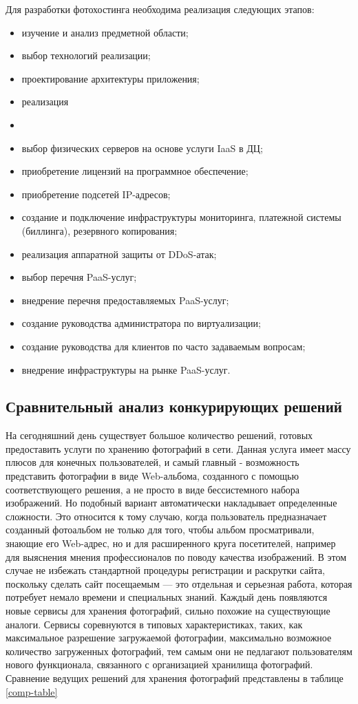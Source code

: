 Для разработки фотохостинга необходима реализация следующих этапов:
\begin{itemize}
    \item изучение и анализ предметной области;
    \item выбор технологий реализации;
    \item проектирование архитектуры приложения;
    \item реализация 
    \item 
    \item выбор физических серверов на основе услуги IaaS в ДЦ;
    \item приобретение лицензий на программное обеспечение;
    \item приобретение подсетей IP-адресов;
    \item создание и подключение инфраструктуры мониторинга, платежной системы (биллинга), резервного копирования;
    \item реализация аппаратной защиты от DDoS-атак;
    \item выбор перечня PaaS-услуг;
    \item внедрение перечня предоставляемых PaaS-услуг;
    \item создание руководства администратора по виртуализации;
    \item создание руководства для клиентов по часто задаваемым вопросам;
    \item внедрение инфраструктуры на рынке PaaS-услуг.
\end{itemize}

\subsection{Сравнительный анализ конкурирующих решений} \label{comparsion}

На сегодняшний день существует большое количество решений, готовых предоставить услуги по хранению фотографий в сети.
Данная услуга имеет массу плюсов для конечных пользователей, и самый главный  - возможность представить фотографии в виде Web-альбома, созданного с помощью соответствующего решения, а не просто в виде бессистемного набора изображений.
Но подобный вариант автоматически накладывает определенные сложности. 
Это относится к тому случаю, когда пользователь предназначает созданный фотоальбом не только для того, чтобы альбом просматривали, знающие его Web-адрес, но и для расширенного круга посетителей, например для выяснения мнения профессионалов по поводу качества изображений.
В этом случае не избежать стандартной процедуры регистрации и раскрутки сайта, поскольку сделать сайт посещаемым — это отдельная и серьезная работа, которая потребует немало времени и специальных знаний.
Каждый день появляются новые сервисы для хранения фотографий, сильно похожие на существующие аналоги.
Сервисы соревнуются в типовых характеристиках, таких, как максимальное разрешение загружаемой фотографии, максимально возможное количество загруженных фотографий, тем самым они не педлагают пользователям нового функционала, связанного с организацией хранилища фотографий.
Сравнение ведущих решений для хранения фотографий представлены в таблице \ref{comp-table}


